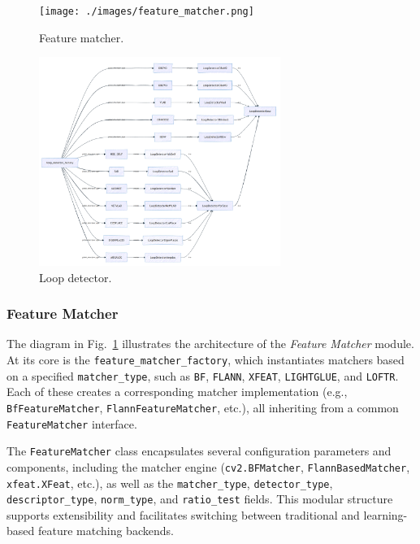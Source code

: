 \documentclass{article}
\begin{document}
\begin{figure}[!t]
\begin{center}
    \texttt{[image: ./images/feature\_matcher.png]}
\end{center}
\caption{Feature matcher.}
\label{Fig:FeatureMatcher}
\end{figure}

\begin{figure}[!t]
\begin{center}
    \includegraphics[width=0.7\textwidth]{./images/loop_detector.png}
\end{center}
\caption{Loop detector.}
\label{Fig:LoopDetector}
\end{figure}


\subsubsection{Feature Matcher}\label{Sect:FeatureMatcher}

The diagram in Fig.~\ref{Fig:FeatureMatcher} illustrates the architecture of the \textit{Feature Matcher} module. At its core is the \texttt{feature\_matcher\_factory}, which instantiates matchers based on a specified \texttt{matcher\_type}, such as \texttt{BF}, \texttt{FLANN}, \texttt{XFEAT}, \texttt{LIGHTGLUE}, and \texttt{LOFTR}. Each of these creates a corresponding matcher implementation (e.g., \texttt{BfFeatureMatcher}, \texttt{FlannFeatureMatcher}, etc.), all inheriting from a common \texttt{FeatureMatcher} interface.

The \texttt{FeatureMatcher} class encapsulates several configuration parameters and components, including the matcher engine (\texttt{cv2.BFMatcher}, \texttt{FlannBasedMatcher}, \texttt{xfeat.XFeat}, etc.), as well as the \texttt{matcher\_type}, \texttt{detector\_type}, \texttt{descriptor\_type}, \texttt{norm\_type}, and \texttt{ratio\_test} fields. This modular structure supports extensibility and facilitates switching between traditional and learning-based feature matching backends.
\end{document}
